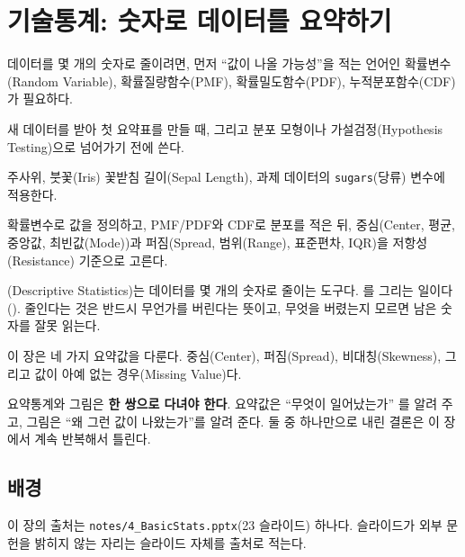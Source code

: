 \chapter{기술통계: 숫자로 데이터를 요약하기}
\label{ch:descriptive}

\begin{inbrief}
  \item[Why] 데이터를 몇 개의 숫자로 줄이려면, 먼저 ``값이 나올 가능성''을
             적는 언어인 확률변수(Random Variable), 확률질량함수(PMF),
             확률밀도함수(PDF), 누적분포함수(CDF)가 필요하다.
  \item[When] 새 데이터를 받아 첫 요약표를 만들 때, 그리고 분포 모형이나
              가설검정(Hypothesis Testing)으로 넘어가기 전에 쓴다.
  \item[Where] 주사위, 붓꽃(Iris) 꽃받침 길이(Sepal Length), 과제 데이터의
               \texttt{sugars}(당류) 변수에 적용한다.
  \item[How] 확률변수로 값을 정의하고, PMF/PDF와 CDF로 분포를 적은 뒤,
             중심(Center, 평균, 중앙값, 최빈값(Mode))과
             퍼짐(Spread, 범위(Range), 표준편차, IQR)을
             저항성(Resistance) 기준으로 고른다.
\end{inbrief}

(Descriptive Statistics)는 데이터를 몇 개의 숫자로 줄이는
도구다. 를 그리는 일이다(). 줄인다는 것은
반드시 무언가를 버린다는 뜻이고, 무엇을 버렸는지 모르면 남은 숫자를 잘못 읽는다.

이 장은 네 가지 요약값을 다룬다. 중심(Center), 퍼짐(Spread), 비대칭(Skewness),
그리고 값이 아예 없는 경우(Missing Value)다.

\begin{keyidea}
요약통계와 그림은 \textbf{한 쌍으로 다녀야 한다}. 요약값은 ``무엇이 일어났는가''
를 알려 주고, 그림은 ``왜 그런 값이 나왔는가''를 알려 준다. 둘 중 하나만으로
내린 결론은 이 장에서 계속 반복해서 틀린다.
\end{keyidea}

\section{배경}
\label{sec:desc-background}

이 장의 출처는 \texttt{notes/4\_BasicStats.pptx}(23 슬라이드) 하나다.
슬라이드가 외부 문헌을 밝히지 않는 자리는 슬라이드 자체를 출처로 적는다.

